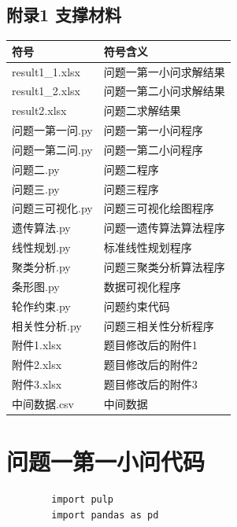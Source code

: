 \documentclass[12pt]{ctexart}
\begin{document}
	\subsection*{附录1 支撑材料}
	\label{sec:appendix}  
	\appendix
\begin{table}[htbp]
	\centering
	\begin{tabular}{m{5cm} m{10cm}}  
		\toprule  
		符号 & 符号含义\\  
		\midrule  
		result1\_1.xlsx & 问题一第一小问求解结果\\  
		result1\_2.xlsx & 问题一第二小问求解结果\\  
		result2.xlsx   & 问题二求解结果\\
		问题一第一问.py & 问题一第一小问程序\\
		问题一第二问.py & 问题一第二小问程序\\
		问题二.py & 问题二程序\\
		问题三.py & 问题三程序\\
		问题三可视化.py & 问题三可视化绘图程序\\
		遗传算法.py & 问题一遗传算法算法程序\\
		线性规划.py & 标准线性规划程序\\
		聚类分析.py & 问题三聚类分析算法程序\\
		条形图.py & 数据可视化程序\\
		轮作约束.py & 问题约束代码\\
		相关性分析.py & 问题三相关性分析程序\\
		附件1.xlsx & 题目修改后的附件1\\
		附件2.xlsx & 题目修改后的附件2\\
		附件3.xlsx & 题目修改后的附件3\\
		中间数据.csv & 中间数据\\
		\bottomrule  
	\end{tabular}  
\end{table}
 
 \newpage
 
	\section{问题一第一小问代码}  
	\noindent 
	\begin{verbatim}
		import pulp
		import pandas as pd
 
	\end{verbatim}
	
\end{document}
